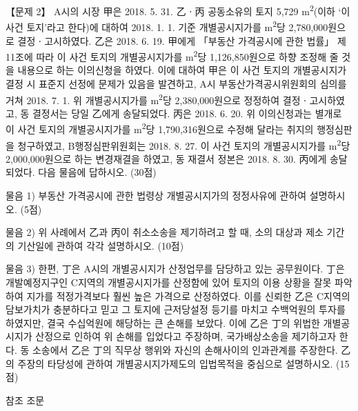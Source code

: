 \begin{longquestion}{【문제 2】}
A시의 시장 甲은 2018. 5. 31. 乙ㆍ丙 공동소유의 토지 5,729 m\textsuperscript{2}(이하 ‘이 사건 토지’라고 한다)에 대하여 2018. 1. 1. 기준 개별공시지가를 m\textsuperscript{2}당 2,780,000원으로 결정ㆍ고시하였다. 乙은 2018. 6. 19. 甲에게 「부동산 가격공시에 관한 법률」 제11조에 따라 이 사건 토지의 개별공시지가를 m\textsuperscript{2}당 1,126,850원으로 하향 조정해 줄 것을 내용으로 하는 이의신청을 하였다. 이에 대하여 甲은 이 사건 토지의 개별공시지가결정 시 표준지 선정에 문제가 있음을 발견하고, A시 부동산가격공시위원회의 심의를 거쳐 2018. 7. 1. 위 개별공시지가를 m\textsuperscript{2}당 2,380,000원으로 정정하여 결정ㆍ고시하였고, 동 결정서는 당일 乙에게 송달되었다. 丙은 2018. 6. 20. 위 이의신청과는 별개로 이 사건 토지의 개별공시지가를 m\textsuperscript{2}당 1,790,316원으로 수정해 달라는 취지의 행정심판을 청구하였고, B행정심판위원회는 2018. 8. 27. 이 사건 토지의 개별공시지가를 m\textsuperscript{2}당 2,000,000원으로 하는 변경재결을 하였고, 동 재결서 정본은 2018. 8. 30. 丙에게 송달되었다. 다음 물음에 답하시오. (30점) \par
\medskip\noindent 물음 1) 부동산 가격공시에 관한 법령상 개별공시지가의 정정사유에 관하여 설명하시오. (5점) \par
\medskip\noindent 물음 2) 위 사례에서 乙과 丙이 취소소송을 제기하려고 할 때, 소의 대상과 제소 기간의 기산일에 관하여 각각 설명하시오. (10점) \par
\medskip\noindent 물음 3) 한편, 丁은 A시의 개별공시지가 산정업무를 담당하고 있는 공무원이다. 丁은 개발예정지구인 C지역의 개별공시지가를 산정함에 있어 토지의 이용 상황을 잘못 파악하여 지가를 적정가격보다 훨씬 높은 가격으로 산정하였다. 이를 신뢰한 乙은 C지역의 담보가치가 충분하다고 믿고 그 토지에 근저당설정 등기를 마치고 수백억원의 투자를 하였지만, 결국 수십억원에 해당하는 큰 손해를 보았다. 이에 乙은 丁의 위법한 개별공시지가 산정으로 인하여 위 손해를 입었다고 주장하며, 국가배상소송을 제기하고자 한다. 동 소송에서 乙은 丁의 직무상 행위와 자신의 손해사이의 인과관계를 주장한다. 乙의 주장의 타당성에 관하여 개별공시지가제도의 입법목적을 중심으로 설명하시오. (15점) \par
\begin{framedtext}
참조 조문 \par

\end{framedtext}
\end{longquestion}
